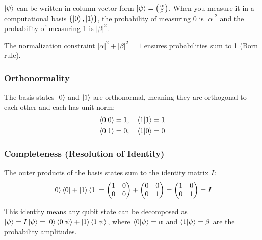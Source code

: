 \documentclass[11pt]{article}
\begin{document}
    $\ket{\psi}$ can be written in column vector form $\ket{\psi} = \bigl( \begin{smallmatrix} \alpha \\ \beta\end{smallmatrix} \bigr)$.
    When you measure it in a computational basis $\{\ket{0}, \ket{1}\}$, the probability of measuring 0 is $|\alpha|^2$ and the probability of measuring 1 is $|\beta|^2$.

    The normalization constraint $|\alpha|^2 + |\beta|^2 = 1$ ensures probabilities sum to 1 (Born rule).

    \subsubsection*{Orthonormality}

    The basis states $\ket{0}$ and $\ket{1}$ are orthonormal, meaning they are orthogonal to each other and each has unit norm:
    \begin{align*}
        \braket{0|0} &= 1, \quad \braket{1|1} = 1 \\
        \braket{0|1} &= 0, \quad \braket{1|0} = 0
    \end{align*}

    \subsubsection*{Completeness (Resolution of Identity)}

    The outer products of the basis states sum to the identity matrix $I$:
    \[
        \ket{0}\bra{0} + \ket{1}\bra{1} = \begin{pmatrix} 1 & 0 \\ 0 & 0 \end{pmatrix} + \begin{pmatrix} 0 & 0 \\ 0 & 1 \end{pmatrix} = \begin{pmatrix} 1 & 0 \\ 0 & 1 \end{pmatrix} = I
    \]

    This identity means any qubit state can be decomposed as $\ket{\psi} = I\ket{\psi} = \ket{0}\braket{0|\psi} + \ket{1}\braket{1|\psi}$,
    where $\braket{0|\psi} = \alpha$ and $\braket{1|\psi} = \beta$ are the probability amplitudes.
\end{document}
